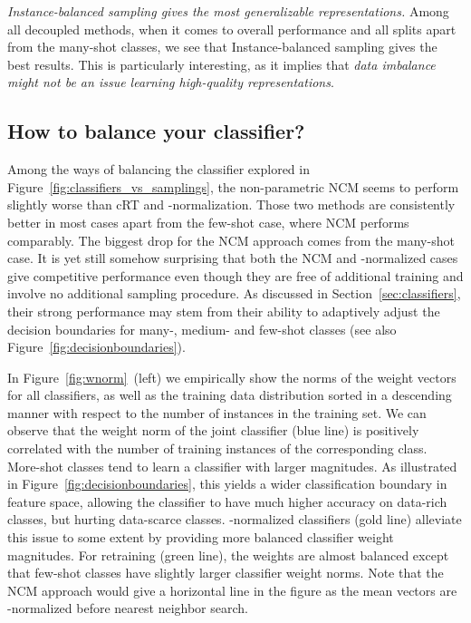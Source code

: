 \documentclass[dvipsnames]{article} \usepackage{iclr2020_conference, times}
\newcommand{\Uniform}{Instance-balanced\xspace}
\newcommand{\ncm}{NCM\xspace}
\newcommand{\retrain}{cRT\xspace}
\newcommand{\wnorm}{-normalized\xspace}
\begin{document}
\emph{\Uniform sampling gives the most generalizable representations.} Among all decoupled methods, when it comes to overall performance  and all splits apart from the many-shot classes, we see that \Uniform sampling gives the best results. This is particularly interesting, as it implies that \emph{data imbalance might not be an issue learning high-quality representations}. 


\subsection{How to balance your classifier?} 


Among the   ways of balancing the classifier explored in Figure~\ref{fig:classifiers_vs_samplings}, the non-parametric \ncm seems to perform slightly worse than \retrain and -normalization. Those two methods are consistently better in most cases apart from the few-shot case, where \ncm performs comparably. The biggest drop for the \ncm approach comes from the many-shot case. It is yet still somehow surprising that both the \ncm and \wnorm cases give competitive performance even though they are free of additional training and involve no additional sampling procedure. 
As discussed in Section~\ref{sec:classifiers}, their strong performance may stem from their ability to adaptively adjust the decision boundaries for many-, medium- and few-shot classes (see also Figure~\ref{fig:decisionboundaries}). 

In Figure~\ref{fig:wnorm}~(left) we empirically show the  norms of the weight vectors for all classifiers, as well as  the training data distribution sorted in a descending manner with respect to the number of instances in the training set. We can observe that the weight norm of the joint classifier (blue line) is positively correlated with the number of training instances of the corresponding class. More-shot classes tend to learn a classifier with larger magnitudes. As illustrated in Figure~\ref{fig:decisionboundaries}, this yields a wider classification boundary in feature space, allowing the classifier to have much higher accuracy on data-rich classes, but hurting data-scarce classes. -normalized classifiers (gold line) alleviate this issue to some extent by providing more balanced classifier weight magnitudes. For retraining (green line), the weights are almost balanced except that few-shot classes have slightly larger classifier weight norms. Note that the \ncm approach would give a horizontal line in the figure as the mean vectors are -normalized before nearest neighbor search. 
\end{document}
